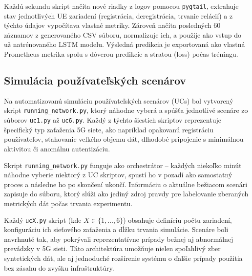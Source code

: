 Každú sekundu skript načíta nové riadky z logov pomocou \texttt{pygtail}, extrahuje stav jednotlivých UE zariadení (registrácia, deregistrácia, trvanie relácií) a z týchto údajov vypočítava vlastné metriky. Zároveň načíta posledných 60 záznamov z generovaného CSV súboru, normalizuje ich, a použije ako vstup do už natrénovaného LSTM modelu. Výsledná predikcia je exportovaná ako vlastná Prometheus metrika spolu s dôverou predikcie a stratou (loss) počas tréningu.

\subsection*{Simulácia používateľských scenárov}

Na automatizovanú simuláciu používateľských scenárov (UCs) bol vytvorený skript \texttt{running\_network.py}, ktorý náhodne vyberá a spúšťa jednotlivé scenáre zo súborov \texttt{uc1.py} až \texttt{uc6.py}. Každý z týchto šiestich skriptov reprezentuje špecifický typ zaťaženia 5G siete, ako napríklad opakovanú registráciu používateľov, sťahovanie veľkého objemu dát, dlhodobé pripojenie s minimálnou aktivitou či anomálnu autentizáciu.

Skript \texttt{running\_network.py} funguje ako orchestrátor – každých niekoľko minút náhodne vyberie niektorý z UC skriptov, spustí ho v pozadí ako samostatný proces a následne ho po skončení ukončí. Informáciu o aktuálne bežiacom scenári zapisuje do súboru, ktorý slúži ako jediný zdroj pravdy pre labelovanie zberaných metrických dát počas trvania experimentu.

Každý \texttt{ucX.py} skript (kde \( X \in \{1, \dots, 6\} \)) obsahuje definíciu počtu zariadení, konfiguráciu ich sieťového zaťaženia a dĺžku trvania simulácie. Scenáre boli navrhnuté tak, aby pokrývali reprezentatívne prípady bežnej aj abnormálnej prevádzky v 5G sieti. Táto architektúra umožňuje nielen spoľahlivý zber syntetických dát, ale aj jednoduché rozšírenie systému o ďalšie prípady použitia bez zásahu do zvyšku infraštruktúry.